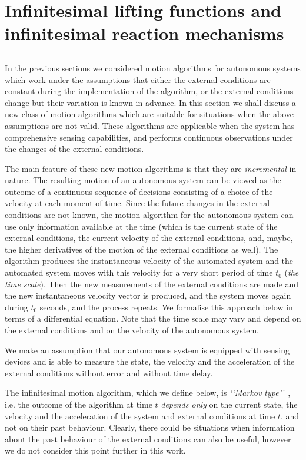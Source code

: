 \documentclass[11pt]{amsart}
\begin{document}
{\section{Infinitesimal lifting functions and infinitesimal reaction mechanisms}\label{sec:ilf}

\subsection{} In the previous sections we considered motion algorithms for autonomous systems which work under the assumptions that either the external conditions are constant during the implementation of the algorithm, or the external conditions change but their variation is known in advance. 
In this section we shall discuss a new class of motion algorithms which are suitable for situations when the above assumptions are not valid. 
These algorithms are applicable when the system has comprehensive sensing capabilities, and performs continuous observations under the changes of the external conditions. 

The main feature of these new motion algorithms is that they are {\it incremental} in nature. 
The resulting motion of an autonomous system can be viewed as the outcome of a continuous sequence of decisions consisting of a choice of the velocity at each moment of time. 
Since the future changes in the external conditions are not known, 
the motion algorithm for the autonomous system can use only information available at the time (which is the current state of the external conditions, the current velocity of the external conditions, and, maybe, the higher derivatives of the motion of the external conditions as well). 
The algorithm produces the instantaneous velocity of the automated system and the automated system moves with this velocity for a very short period of time $t_0$ ({\it the time scale}). Then the new measurements of the external conditions are made and the new instantaneous velocity vector is produced, and the system moves again during $t_0$ seconds, and the process repeats. We formalise this approach below in terms of a differential equation. Note that the time scale may vary and depend on the external conditions and on the velocity of the autonomous system. 

We make an assumption that our autonomous system is equipped with sensing devices and is able to measure the state, the velocity and the acceleration of the external conditions without error and without time delay. 

The infinitesimal motion algorithm, which we define below, 
is  {\it \lq\lq Markov type\rq\rq}\ , i.e. the outcome of the algorithm at time $t$
{\it depends only} on the current state, the velocity and the acceleration of the system and external conditions at time $t$, and not on their past behaviour. 
Clearly, there could be situations when information about the past behaviour of the external conditions can also be useful, however we do not consider this point further in this work. 





}
\end{document}
